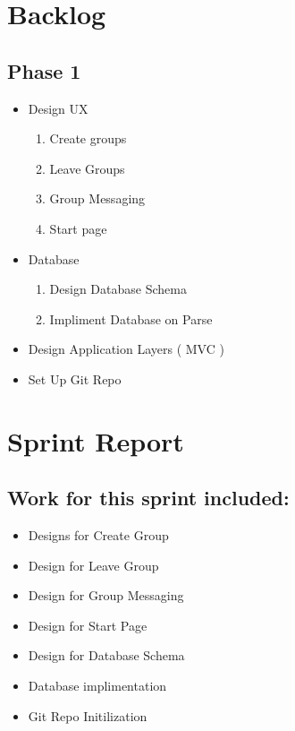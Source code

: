\section*{Backlog}

\subsection*{Phase 1}

	
	\begin{itemize}
	\item Design UX
		\begin{enumerate}
		\item Create groups
		\item Leave Groups
		\item Group Messaging
		\item Start page
		\end{enumerate}
	\item Database
		\begin{enumerate}
		\item Design Database Schema
		\item Impliment Database on Parse
		\end{enumerate}
	\item Design Application Layers ( MVC )
	\item Set Up Git Repo
	\end{itemize}
	
\section*{Sprint Report}

\subsection*{Work for this sprint included:}
	\begin{itemize}
	\item Designs for Create Group
	\item Design for Leave Group
	\item Design for Group Messaging
	\item Design for Start Page
	\item Design for Database Schema
	\item Database implimentation
	\item Git Repo Initilization 
	\end{itemize}









